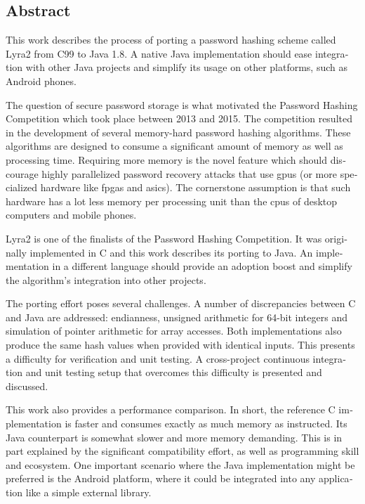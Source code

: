 \cleardoublepage
{}

\begin{otherlanguage}{english}
\chapter*{Abstract}

This work describes the process of porting a password hashing scheme called Lyra2 from C99 to Java 1.8. A native Java implementation should ease integration with other Java projects and simplify its usage on other platforms, such as Android phones.

The question of secure password storage is what motivated the Password Hashing Competition which took place between 2013 and 2015. The competition resulted in the development of several memory-hard password hashing algorithms. These algorithms are designed to consume a significant amount of memory as well as processing time. Requiring more memory is the novel feature which should discourage highly parallelized password recovery attacks that use \gls{gpus} (or more specialized hardware like \gls{fpgas} and \gls{asics}). The cornerstone assumption is that such hardware has a lot less memory per processing unit than the \gls{cpus} of desktop computers and mobile phones.

Lyra2 is one of the finalists of the Password Hashing Competition. It was originally implemented in C and this work describes its porting to Java. An implementation in a different language should provide an adoption boost and simplify the algorithm's integration into other projects.

The porting effort poses several challenges. A number of discrepancies between C and Java are addressed: endianness, unsigned arithmetic for 64-bit integers and simulation of pointer arithmetic for array accesses. Both implementations also produce the same hash values when provided with identical inputs. This presents a difficulty for verification and unit testing. A cross-project continuous integration and unit testing setup that overcomes this difficulty is presented and discussed.

This work also provides a performance comparison. In short, the reference C implementation is faster and consumes exactly as much memory as instructed. Its Java counterpart is somewhat slower and more memory demanding. This is in part explained by the significant compatibility effort, as well as programming skill and ecosystem. One important scenario where the Java implementation might be preferred is the Android platform, where it could be integrated into any application like a simple external library.


\end{otherlanguage}
